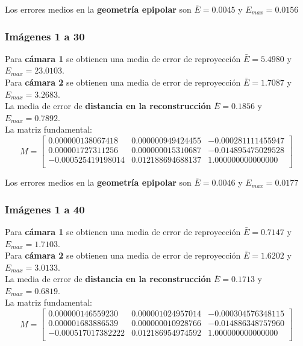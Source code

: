 \documentclass[a4paper, fontsize=11pt]{scrartcl} %
\numberwithin{equation}{section} %
\numberwithin{figure}{section} %
\numberwithin{table}{section} %
\begin{document}
	Los errores medios en la \textbf{geometría epipolar} son $\bar{E} = 0.0045$ y $E_{max} = 0.0156$
	
	\subsubsection*{Imágenes 1 a 30}
	
	Para \textbf{cámara 1} se obtienen una media de error de reproyección $\bar{E} = 5.4980$ y $E_{max} = 23.0103$.\\
	Para \textbf{cámara 2} se obtienen una media de error de reproyección $\bar{E} = 1.7087$ y $E_{max} = 3.2683$.\\
	
	La media de error de \textbf{distancia en la reconstrucción} $\bar{E} = 0.1856$ y $E_{max} = 0.7892$.\\
	La matriz fundamental:
	\[
	M=
	\begin{bmatrix}
	0.000000138067418&	0.000000949424455&	-0.000281111455947 \\
	0.000001727311256&	0.000000015310687&	-0.014895475029528 \\
	-0.000525419198014&	0.012188694688137&	1.000000000000000  \\
	
	\end{bmatrix}
	\]
	
	Los errores medios en la \textbf{geometría epipolar} son $\bar{E} =  0.0046$ y $E_{max} = 0.0177$
	
	\subsubsection*{Imágenes 1 a 40}
	
	Para \textbf{cámara 1} se obtienen una media de error de reproyección $\bar{E} = 0.7147$ y $E_{max} = 1.7103$.\\
	Para \textbf{cámara 2} se obtienen una media de error de reproyección $\bar{E} = 1.6202$ y $E_{max} = 3.0133$.\\
	
	La media de error de \textbf{distancia en la reconstrucción} $\bar{E} = 0.1713$ y $E_{max} = 0.6819$.\\
	La matriz fundamental:
	\[
	M=
	\begin{bmatrix}
	0.000000146559230&	0.000001024957014&	-0.000304576348115 \\
	0.000001683886539&	0.000000010928766&	-0.014886348757960 \\
	-0.000517017382222&	0.012186954974592&	1.000000000000000  \\
	
	\end{bmatrix}
	\]
	
\end{document}
